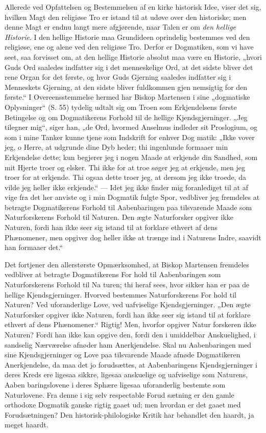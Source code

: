 \documentclass[12pt]{book}
\newcommand{\opage}[1]{\marginnote{\footnotesize\textit{[#1]}}}
\begin{document}
Allerede ved Opfattelsen og Bestemmelsen af en kirke\-%
historisk Idee, viser det sig, hvilken Magt den religiøse Tro
er istand til at udøve over den historiske; men denne Magt
er endnu langt mere afgjørende, naar Talen er om \emph{den
hellige Historie}. I den hellige Historie maa Grundideen
oprindelig bestemmes ved den religiøse, ene og alene ved den
religiøse Tro. Derfor er Dogmatiken, som vi have seet,
saa forvisset om, at den hellige Historie absolut maa være
en Historie, „hvori Guds Ord saaledes indfatter sig i det
menneskelige Ord, at det sidste bliver det rene Organ for
det første, og hvor Guds Gjerning saaledes indfatter sig i
Menneskets Gjerning, at den sidste bliver fuldkommen gjen\-%
\opage{45}\setcounter{footnote}{0}%
nemsigtig for den første.“ I Overeensstemmelse hermed
har Biskop Martensen i sine „dogmatiske Oplysninger“
(S. 55) tydelig udtalt sig om Troen som Erkjendelsens første
Betingelse og om Dogmatikerens Forhold til de hellige
Kjendsgjerninger. „Jeg tilegner mig“, siger han, „de Ord,
hvormed Anselmus indleder sit Proslogium, og som i
mine Tanker kunne tjene som Indskrift for enhver Dog\-%
matik: „Ikke vover jeg, o Herre, at udgrunde dine Dyb\-%
heder; thi ingenlunde formaaer min Erkjendelse dette; kun
begjerer jeg i nogen Maade at erkjende din Sandhed, som
mit Hjerte troer og elsker. Thi ikke for at troe søger jeg
at erkjende, men jeg troer for at erkjende. Thi ogsaa dette
troer jeg, at dersom jeg ikke troede, da vilde jeg heller ikke
erkjende.“ --- Idet jeg ikke finder mig foranlediget til at af\-%
vige fra det her anviste og i min Dogmatik fulgte Spor,
vedbliver jeg fremdeles at betragte Dogmatikerens Forhold
til Aabenbaringen paa tilsvarende Maade som Naturforskerens
Forhold til Naturen. Den ægte Naturforsker opgiver ikke
Naturen, fordi han ikke seer sig istand til at forklare ethvert
af dens Phænomener, men opgiver dog heller ikke at trænge
ind i Naturens Indre, saavidt han formaaer det.“

Det fortjener den allerstørste Opmærksomhed, at Biskop
Martensen fremdeles vedbliver at betragte Dogmatikerens For\-%
hold til Aabenbaringen som Naturforskerens Forhold til Na\-%
turen; thi heraf sees, hvor sikker han er paa de hellige
Kjendsgjerninger. Hvorved bestemmes Naturforskerens For\-%
hold til Naturen? Ved uforanderlige Love, ved uafviselige
Kjendsgjerninger. „Den ægte Naturforsker opgiver ikke
Naturen, fordi han ikke seer sig istand til at forklare ethvert
af dens Phænomener.“ Rigtig! Men, hvorfor opgiver Natur\-%
forskeren ikke Naturen? Fordi han ikke kan opgive den,
fordi den i umiddelbar Anskuelighed, i sandselig Nærværelse
afnøder ham Anerkjendelse. Skal nu Aabenbaringen med
sine Kjendsgjerninger og Love paa tilsvarende Maade afnøde
\opage{46}\setcounter{footnote}{0}%
Dogmatikeren Anerkjendelse, da maa det jo forudsættes, at
Aabenbaringens Kjendsgjerninger i deres Kreds ere ligesaa
sikkre, ligesaa anskuelige og uafviselige som Naturens, Aaben\-%
baringslovene i deres Sphære ligesaa uforanderlig bestemte
som Naturlovene. Fra denne i sig selv respectable Forud\-%
sætning er den gamle orthodoxe Dogmatik ganske rigtig gaaet
ud; men hvordan er det gaaet med Forudsætningen? Den
historisk-philologiske Kritik har behandlet den haardt, ja meget
haardt.
\end{document}
